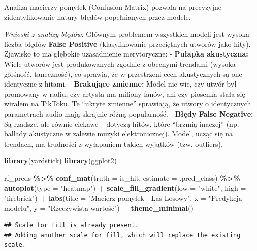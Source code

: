 \documentclass[
]{article}
\newenvironment{Shaded}{\begin{snugshade}}{\end{snugshade}}
\newcommand{\AttributeTok}[1]{\textcolor[rgb]{0.13,0.29,0.53}{#1}}
\newcommand{\FunctionTok}[1]{\textcolor[rgb]{0.13,0.29,0.53}{\textbf{#1}}}
\newcommand{\NormalTok}[1]{#1}
\newcommand{\SpecialCharTok}[1]{\textcolor[rgb]{0.81,0.36,0.00}{\textbf{#1}}}
\newcommand{\StringTok}[1]{\textcolor[rgb]{0.31,0.60,0.02}{#1}}
\begin{document}
Analiza macierzy pomyłek (Confusion Matrix) pozwala na precyzyjne
zidentyfikowanie natury błędów popełnianych przez modele.

\emph{Wnioski z analizy błędów:} Głównym problemem wszystkich modeli
jest wysoka liczba błędów \textbf{False Positive} (klasyfikowanie
przeciętnych utworów jako hity). Zjawisko to ma głębokie uzasadnienie
merytoryczne: - \textbf{Pułapka akustyczna:} Wiele utworów jest
produkowanych zgodnie z obecnymi trendami (wysoka głośność, taneczność),
co sprawia, że w przestrzeni cech akustycznych są one identyczne z
hitami. - \textbf{Brakujące zmienne:} Model nie wie, czy utwór był
promowany w radiu, czy artysta ma miliony fanów, ani czy piosenka stała
się wiralem na TikToku. Te ``ukryte zmienne'' sprawiają, że utwory o
identycznych parametrach audio mają skrajnie różną popularność. -
\textbf{Błędy False Negative:} Są rzadsze, ale równie ciekawe -- dotyczą
hitów, które ``brzmią inaczej'' (np. ballady akustyczne w zalewie muzyki
elektronicznej). Model, ucząc się na trendach, ma trudności z wyłapaniem
takich wyjątków (tzw. outliers).

\begin{Shaded}
\begin{Highlighting}[]
\FunctionTok{library}\NormalTok{(yardstick)}
\FunctionTok{library}\NormalTok{(ggplot2)}

\NormalTok{rf\_preds }\SpecialCharTok{\%\textgreater{}\%}
  \FunctionTok{conf\_mat}\NormalTok{(}\AttributeTok{truth =}\NormalTok{ is\_hit, }\AttributeTok{estimate =}\NormalTok{ .pred\_class) }\SpecialCharTok{\%\textgreater{}\%}
  \FunctionTok{autoplot}\NormalTok{(}\AttributeTok{type =} \StringTok{"heatmap"}\NormalTok{) }\SpecialCharTok{+}
  \FunctionTok{scale\_fill\_gradient}\NormalTok{(}\AttributeTok{low =} \StringTok{"white"}\NormalTok{, }\AttributeTok{high =} \StringTok{"firebrick"}\NormalTok{) }\SpecialCharTok{+}
  \FunctionTok{labs}\NormalTok{(}\AttributeTok{title =} \StringTok{"Macierz pomyłek {-} Las Losowy"}\NormalTok{,}
       \AttributeTok{x =} \StringTok{"Predykcja modelu"}\NormalTok{,}
       \AttributeTok{y =} \StringTok{"Rzeczywista wartość"}\NormalTok{) }\SpecialCharTok{+}
  \FunctionTok{theme\_minimal}\NormalTok{()}
\end{Highlighting}
\end{Shaded}

\begin{verbatim}
## Scale for fill is already present.
## Adding another scale for fill, which will replace the existing scale.
\end{verbatim}
\end{document}
